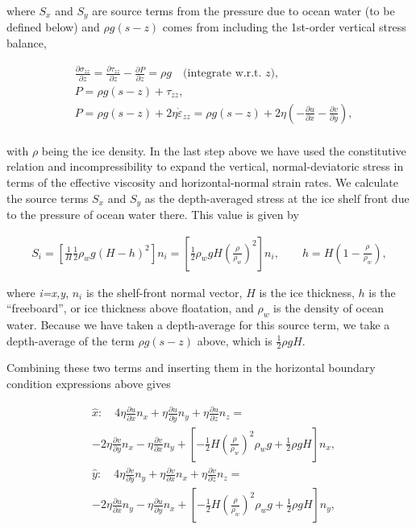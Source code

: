 where $S_x$ and $S_y$ are source terms from the pressure due to ocean water (to be defined below) and $\rho g\left( s-z \right)$ comes from including the 1st-order vertical stress balance,

\begin{align*}
  & \frac{\partial \sigma _{zz}}{\partial z}=\frac{\partial \tau _{zz}}{\partial z}-\frac{\partial P}{\partial z}=\rho g\quad \text{(integrate w}\text{.r}\text{.t}\text{. $z$)}, \\ 
 & P=\rho g\left( s-z \right)+\tau _{zz}, \\ 
 & P=\rho g\left( s-z \right)+2\eta \dot{\varepsilon }_{zz}=\rho g\left( s-z \right)+2\eta \left( -\frac{\partial u}{\partial x}-\frac{\partial v}{\partial y} \right), \\ 
\end{align*}

with \textit{\(\rho{}\)} being the ice density. In the last step above we have used the constitutive relation and incompressibility to expand the vertical, normal-deviatoric stress in terms of the effective viscosity and horizontal-normal strain rates. We calculate the source terms $S_x$ and $S_y$ as the depth-averaged stress at the ice shelf front due to the pressure of ocean water there. This value is given by

\begin{align*}
S_{i}=\left[ \frac{1}{H}\frac{1}{2}\rho _{w}g\left( H-h \right)^{2} \right]n_{i}=\left[ \frac{1}{2}\rho _{w}gH\left( \frac{\rho }{\rho _{w}} \right)^{2} \right]n_{i},\quad \quad h=H\left( 1-\frac{\rho _{{}}}{\rho _{w}} \right),
\end{align*}

where  \textit{i=x,y}, $n_i$ is the shelf-front normal vector, $H$ is the ice thickness, $h$ is the ``freeboard'', or ice thickness above floatation, and $\rho_w$ is the density of ocean water. Because we have taken a depth-average for this source term, we take a depth-average of the term $\rho g\left( s-z \right)$ above, which is $\frac{1}{2}\rho gH$.

Combining these two terms and inserting them in the horizontal boundary condition expressions above gives

\begin{align*}
& \hat{x}:\quad 4\eta \frac{\partial u}{\partial x}n_{x}+\eta \frac{\partial u}{\partial y}n_{y}+\eta \frac{\partial u}{\partial z}n_{z}= \\
& -2\eta \frac{\partial v}{\partial y}n_{x}-\eta \frac{\partial v}{\partial x}n_{y}+\left[ -\frac{1}{2}H\left( \frac{\rho }{\rho _{w}} \right)^{2}\rho _{w}g+\frac{1}{2}\rho gH \right]n_{x}, \\ 
 & \hat{y}:\quad 4\eta \frac{\partial v}{\partial y}n_{y}+\eta \frac{\partial v}{\partial x}n_{x}+\eta \frac{\partial v}{\partial z}n_{z}= \\
 & -2\eta \frac{\partial u}{\partial x}n_{y}-\eta \frac{\partial u}{\partial y}n_{x}+\left[ -\frac{1}{2}H\left( \frac{\rho }{\rho _{w}} \right)^{2}\rho _{w}g+\frac{1}{2}\rho gH \right]n_{y}, \\ 
\end{align*}

